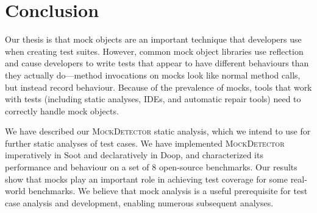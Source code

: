 \section{Conclusion}
\label{sec:conclusion}

Our thesis is that mock objects are an important technique that developers use when creating test suites. However, common mock object libraries use reflection and cause developers to write tests that appear to have different behaviours than they actually do---method invocations on mocks look like normal method calls, but instead record behaviour. Because of the prevalence of mocks, tools that work with tests (including static analyses, IDEs, and automatic repair tools) need to correctly handle mock objects. 

We have described our \textsc{MockDetector} static analysis, which we intend to use for further static analyses of test cases. We have implemented \textsc{MockDetector} imperatively in Soot and declaratively in Doop, and characterized its performance and behaviour on a set of 8 open-source benchmarks. Our results show that mocks play an important role in achieving test coverage for some real-world benchmarks. We believe that mock analysis is a useful prerequisite for test case analysis and development, enabling numerous subsequent analyses.



